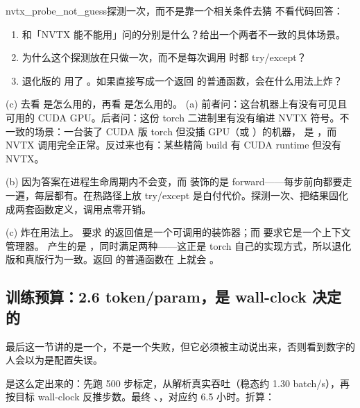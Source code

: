 \begin{checkpoint}{nvtx_probe_not_guess}{探测一次，而不是靠一个相关条件去猜}
不看代码回答：
\begin{enumerate}[label=(\alph*)]
  \item {} 和「NVTX 能不能用」问的分别是什么？给出一个两者不一致的具体场景。
  \item 为什么这个探测放在只做一次，而不是每次调用  时都 try/except？
  \item 退化版的  用了 。如果直接写成一个返回  的普通函数，会在什么用法上炸？
\end{enumerate}
\hint (c) 去看  是怎么用的，再看  是怎么用的。
\ifshowanswers
\tcblower
\answer (a) 前者问：这台机器上有没有可见且可用的 CUDA GPU。后者问：这份 torch 二进制里有没有编进 NVTX 符号。不一致的场景：一台装了 CUDA 版 torch 但没插 GPU（或 ）的机器， 是 ，而 NVTX 调用完全正常。反过来也有：某些精简 build 有 CUDA runtime 但没有 NVTX。

(b) 因为答案在进程生命周期内不会变，而  装饰的是 forward——每步前向都要走一遍，每层都有。在热路径上放 try/except 是白付代价。探测一次、把结果固化成两套函数定义，调用点零开销。

(c) 炸在用法上。 要求  的返回值是一个可调用的装饰器；而  要求它是一个上下文管理器。 产生的是 ，同时满足两种——这正是 torch 自己的实现方式，所以退化版和真版行为一致。返回  的普通函数在  上就会 。
\whereincode {}
\fi
\end{checkpoint}

\subsection{训练预算：2.6 token/param，是 wall-clock 决定的}
\label{subsec:budget}

最后这一节讲的是一个，不是一个失败，但它必须被主动说出来，否则看到数字的人会以为是配置失误。

 是这么定出来的：先跑 500 步标定，从解析真实吞吐（稳态约 1.30 batch/s），再按目标 wall-clock 反推步数。最终 、，对应约 6.5 小时。折算：

